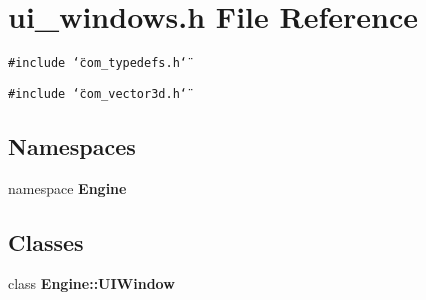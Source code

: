 \section{ui\_\-windows.h File Reference}
\label{ui__windows_8h}
{\tt \#include \char`\"{}com\_\-typedefs.h\char`\"{}}\par
{\tt \#include \char`\"{}com\_\-vector3d.h\char`\"{}}\par
\subsection*{Namespaces}
\begin{CompactItemize}
\item 
namespace {\bf Engine}
\end{CompactItemize}
\subsection*{Classes}
\begin{CompactItemize}
\item 
class {\bf Engine::UIWindow}
\end{CompactItemize}
